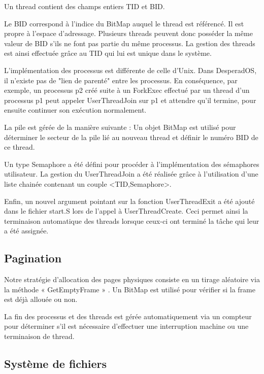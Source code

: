 \documentclass[12pt]{report}
\begin{document}
Un thread contient des champs entiers TID et BID.

Le BID correspond à l'indice du BitMap auquel le thread est référencé. Il est propre à l'espace d'adressage. Plusieurs threads peuvent donc posséder la même valeur de BID s'ils ne font pas partie du même processus. La gestion des threads est ainsi effectuée grâce au TID qui lui est unique dans le système.

\bigskip

L'implémentation des processus est différente de celle d'Unix. Dans DesperadOS, il n'existe pas de "lien de parenté" entre les processus. En conséquence, par exemple, un processus p2 créé suite à un ForkExec effectué par un thread d'un processus p1 peut appeler UserThreadJoin sur p1 et attendre qu'il termine, pour ensuite continuer son exécution normalement.
\bigskip

La pile est gérée de la manière suivante :
Un objet BitMap est utilisé pour déterminer le secteur de la pile lié au nouveau thread et définir le numéro BID de ce thread.

Un type Semaphore a été défini pour procéder à l'implémentation des sémaphores utilisateur. 
La gestion du UserThreadJoin a été réalisée grâce à l'utilisation d'une liste chainée contenant un couple <TID,Semaphore>.

Enfin, un nouvel argument pointant sur la fonction UserThreadExit a été ajouté dans le fichier start.S lors de l'appel à UserThreadCreate. Ceci permet ainsi la terminaison automatique des threads lorsque ceux-ci ont terminé la tâche qui leur a été assignée.



\subsection{Pagination}


Notre stratégie d’allocation des pages physiques consiste en un tirage aléatoire via la méthode « GetEmptyFrame » . Un BitMap est utilisé pour vérifier si la frame est déjà allouée ou non.
\bigskip

La fin des processus et des threads est gérée automatiquement via un compteur pour déterminer s'il est nécessaire d'effectuer une interruption machine ou une terminaison de thread.
\bigskip


\subsection{Système de fichiers}
\end{document}
